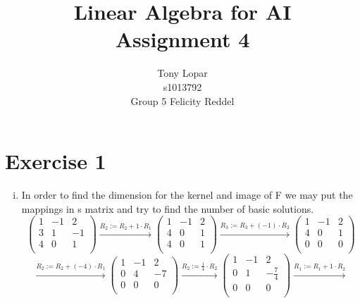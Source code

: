 \documentclass[a4paper]{article}
\title{Linear Algebra for AI\\Assignment 4}
\author{Tony Lopar \\ s1013792 \\ Group 5 \quad Felicity Reddel}
\begin{document}
\maketitle

\section*{Exercise 1}
\begin{enumerate}[i)]
  \item In order to find the dimension for the kernel and image of F we may put the mappings in s matrix and try to find the number of basic solutions.
  \[
  \left(
  \begin{array}{ccc}
  1 & -1 & 2 \\
  3 & 1 & -1 \\
  4 & 0 & 1 \\
  \end{array}
  \right)
  \xrightarrow{\text{$R_2 := R_2 + 1 \cdot R_1$}}
    \left(
    \begin{array}{ccc}
    1 & -1 & 2 \\
    4 & 0 & 1 \\
    4 & 0 & 1 \\
    \end{array}
    \right)
    \xrightarrow{\text{$R_3 := R_3 + (-1) \cdot R_2$}}
      \left(
      \begin{array}{ccc}
      1 & -1 & 2 \\
      4 & 0 & 1 \\
      0 & 0 & 0 \\
      \end{array}
      \right)
  \]
  \[
  \xrightarrow{\text{$R_2 := R_2 + (-4) \cdot R_1$}}
    \left(
    \begin{array}{ccc}
    1 & -1 & 2 \\
    0 & 4 & -7 \\
    0 & 0 & 0 \\
    \end{array}
    \right)
    \xrightarrow{\text{$R_2 := \frac{1}{4} \cdot R_2$}}
      \left(
      \begin{array}{ccc}
      1 & -1 & 2 \\
      0 & 1 & - \frac{7}{4} \\
      0 & 0 & 0 \\
      \end{array}
      \right)
      \xrightarrow{\text{$R_1 := R_1 + 1 \cdot R_2$}}
\]
\end{enumerate}
\end{document}
